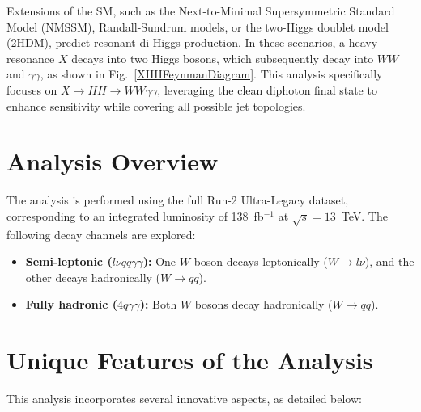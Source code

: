 Extensions of the SM, such as the Next-to-Minimal Supersymmetric Standard Model (NMSSM), Randall-Sundrum models, or the two-Higgs
doublet model (2HDM), predict resonant di-Higgs production. In these scenarios, a heavy resonance \(X\) decays into two Higgs
bosons, which subsequently decay into \(WW\) and \(\gamma\gamma\), as shown in Fig.~\ref{XHHFeynmanDiagram}. This analysis specifically focuses on \(X \to HH \to
WW\gamma\gamma\), leveraging the clean diphoton final state to enhance sensitivity while covering all possible jet topologies.


\section{Analysis Overview}
The analysis is performed using the full Run-2 Ultra-Legacy dataset, corresponding to an integrated luminosity of 138~fb\(^{-1}\) at
\(\sqrt{s} = 13\)~TeV. The following decay channels are explored:
\begin{itemize}
    \item \textbf{Semi-leptonic (\(l\nu qq\gamma\gamma\)):} One \(W\) boson decays leptonically (\(W \to l\nu\)), and the other
    decays hadronically (\(W \to qq\)).
    \item \textbf{Fully hadronic (\(4q\gamma\gamma\)):} Both \(W\) bosons decay hadronically (\(W \to qq\)).
\end{itemize}

\section{Unique Features of the Analysis}
This analysis incorporates several innovative aspects, as detailed below:

